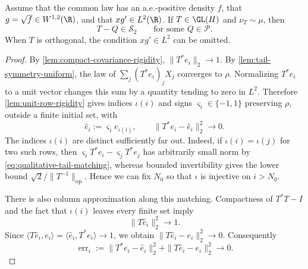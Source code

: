\begin{lemma}
\label{lem:hilbert-schmidt-necessity}
Assume that the common law has an a.e.-positive density $f$, that
$g=\sqrt f\in W^{1,2}(\R)$, and that $xg'\in L^2(\R)$.
If $T\in\GL(H)$ and $\nu_T\sim\mu$, then
\begin{equation}
 T-Q\in\mathcal S_2
 \qquad\text{for some }Q\in\mathcal P.
 \label{eq:hilbert-schmidt-necessity}
\end{equation}
When $T$ is orthogonal, the condition $xg'\in L^2$ can be omitted.
\end{lemma}
\begin{proof}
By \cref{lem:compact-covariance-rigidity}, $\|T^*e_i\|_2\to1$.
By \cref{lem:tail-symmetry-uniform}, the law of
$\sum_j(T^*e_i)_jX_j$ converges to $\rho$.
Normalizing $T^*e_i$ to a unit vector changes this sum by a quantity tending to
zero in $L^2$.
Therefore \cref{lem:unit-row-rigidity} gives indices $\iota(i)$ and signs
$\varsigma_i\in\{-1,1\}$ preserving $\rho$, outside a finite initial set, with
\begin{equation}
 \widehat e_i:=\varsigma_i e_{\iota(i)},\qquad
 \|T^*e_i-\widehat e_i\|_2^2\longrightarrow0.
 \label{eq:qualitative-tail-matching}
 \end{equation}
The indices $\iota(i)$ are distinct sufficiently far out.
Indeed, if
$\iota(i)=\iota(j)$ for two such rows, then
$\varsigma_iT^*e_i-\varsigma_jT^*e_j$ has arbitrarily small norm
by \eqref{eq:qualitative-tail-matching}, whereas bounded
invertibility gives the lower bound $\sqrt2/\|T^{-1}\|_{\mathrm{op}}$.
Hence we can fix $N_0$ so that $\iota$ is injective on $i>N_0$.

There is also column approximation along this matching.
Compactness
of $T^*T-I$ and the fact that $\iota(i)$ leaves every finite set imply
\[
 \|T\widehat e_i\|_2^2\longrightarrow1.
\]
Since $\langle T\widehat e_i,e_i\rangle
=\langle \widehat e_i,T^*e_i\rangle\to1$,
we obtain $\|T\widehat e_i-e_i\|_2^2\to0$.  Consequently
\begin{equation}
 \operatorname{err}_i:=\|T^*e_i-\widehat e_i\|_2^2
       +\|T\widehat e_i-e_i\|_2^2\longrightarrow0.
 \label{eq:row-column-tail-errors}
\end{equation}


\end{proof}
